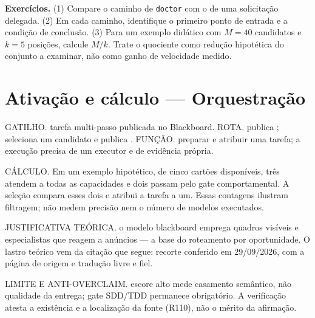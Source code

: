 \begin{resultado}
\textbf{Exercícios.} (1) Compare o caminho de \texttt{doctor} com o de uma
solicitação delegada. (2) Em cada caminho, identifique o primeiro ponto de
entrada e a condição de conclusão. (3) Para um exemplo didático com $M=40$ candidatos e
$k=5$ posições, calcule $M/k$. Trate o quociente como redução hipotética do
conjunto a examinar, não como ganho de velocidade medido.
\end{resultado}


\section[Ativação e cálculo]{Ativação e cálculo — Orquestração}

\begin{processo}
GATILHO. tarefa multi-passo publicada no Blackboard.
ROTA.  publica ;  seleciona um candidato
e publica . FUNÇÃO. preparar e atribuir uma tarefa;
a execução precisa de um executor e de evidência própria.
\end{processo}

\begin{resultado}
CÁLCULO. Em um exemplo hipotético, de cinco cartões disponíveis, três atendem
a todas as capacidades e dois passam pelo gate comportamental. A seleção
compara esses dois e atribui a tarefa a um. Essas contagens ilustram filtragem;
não medem precisão nem o número de modelos executados.
\end{resultado}

\begin{descricao}
JUSTIFICATIVA TEÓRICA. o modelo blackboard emprega quadros visíveis e especialistas que reagem a anúncios — a base do roteamento por oportunidade. O lastro teórico vem da citação que segue: recorte conferido em 29/09/2026, com a página de origem e tradução livre e fiel.
\end{descricao}

\begin{aviso}
LIMITE E ANTI-OVERCLAIM. escore alto mede casamento semântico, não qualidade da entrega; gate SDD/TDD permanece obrigatório. A verificação atesta a existência e a
localização da fonte (R110), não o mérito da afirmação.
\end{aviso}

